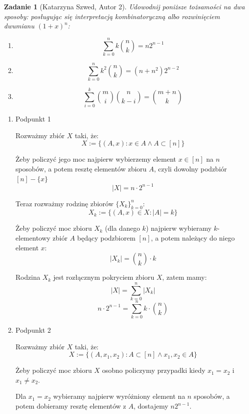 \documentclass{mwart}
\newtheorem{zad}{Zadanie}[section]
\begin{document}
\begin{zad}[Katarzyna Szwed, Autor 2]
    Udowodnij poniższe tożsamości na dwa sposoby: posługując się interpretacją
    kombinatoryczną albo rozwinięciem dwumianu $(1 + x)^n$:
    \begin{enumerate}
        \item \[\sum_{k=0}^{n}k\binom{n}{k} = n2^{n-1}\]
        \item \[\sum_{k=0}^{n}k^2\binom{n}{k}= (n+n^2)2^{n-2}\]
        \item \[\sum_{i=0}^{k}\binom{m}{i}\binom{n}{k-i} = \binom{m+n}{k} \]
    \end{enumerate}
\end{zad}
\begin{mdframed}
    \begin{enumerate}
        \item Podpunkt 1

              Rozważmy zbiór $X$ taki, że:
              \[X := \{ (A, x) : x \in A \wedge A \subset [n]\}\]

              Żeby policzyć jego moc najpierw wybierzemy element $x \in [n]$ na $n$ sposobów,
              a potem resztę elementów zbioru $A$, czyli dowolny podzbiór $[n]-\{x\}$
              \[|X| = n \cdot 2^{n-1}\]

              Teraz rozważmy rodzinę zbiorów $\{X_k\}_{k=0}^n$:
              \[X_k := \{(A, x) \in X : |A| = k\}\]

              Żeby policzyć moc zbioru $X_k$ (dla danego $k$) najpierw wybieramy $k$-elementowy zbiór $A$ będący podzbiorem $[n]$, a potem należący
              do niego element $x$:
              \[|X_k| = {n \choose k} \cdot k\]

              Rodzina $X_k$ jest rozłącznym pokryciem zbioru $X$, zatem mamy:
              \[|X| = \sum_{k=0}^{n} |X_k|\]
              \[n \cdot 2^{n-1} = \sum_{k=0}^{n} k \cdot {n \choose k}\]

        \item Podpunkt 2

              Rozważmy zbiór $X$ taki, że:
              \[X := \{(A, x_1, x_2) : A \subset [n] \wedge x_1, x_2 \in A\}\]

              Żeby policzyć moc zbioru $X$ osobno policzymy przypadki kiedy $x_1 = x_2$ i $x_1 \neq x_2$.

              Dla $x_1 = x_2$ wybieramy najpierw wyróżniony element na $n$ sposobów, a potem dobieramy resztę elementów z $A$,
              dostajemy $n2^{n-1}$.


\end{enumerate}
\end{mdframed}
\end{document}
